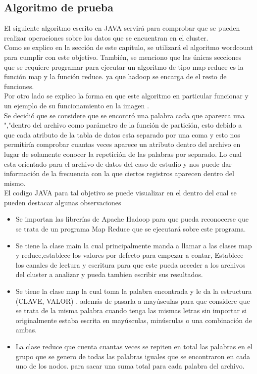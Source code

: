 \subsection{Algoritmo de prueba}
El siguiente algoritmo escrito en JAVA servirá para comprobar que se pueden realizar operaciones sobre los datos
que se encuentran en el cluster.
\\
Como se explico en la sección  de este capitulo, se utilizará el algoritmo wordcount para cumplir con este objetivo.
También, se menciono que las únicas secciones que se requiere programar para ejecutar un algoritmo de tipo map
reduce es la función map y la función reduce. ya que hadoop se encarga de el resto de funciones.
\\
Por otro lado se explico la forma en que este algoritmo en particular funcionar y un ejemplo de su funcionamiento en
la imagen .
\\
Se decidió que se considere que se encontró una palabra cada que aparezca una ","dentro del archivo como parámetro
de la función de partición, esto debido a que cada atributo de la tabla de datos esta separado por una coma y esto nos
permitiría comprobar cuantas veces aparece un atributo dentro del archivo en lugar de solamente conocer la repetición
de las palabras por separado. Lo cual esta orientado para el archivo de datos del caso de estudio y nos puede dar
información de la frecuencia con la que ciertos registros aparecen dentro del mismo.
\\
El codigo JAVA para tal objetivo se puede visualizar en el 
dentro del cual se pueden destacar algunas observaciones
\begin{itemize}
	\item Se importan las librerías de Apache Hadoop para que pueda reconocerse que se trata de un programa Map Reduce
	que se ejecutará sobre este programa.
	\item Se tiene la clase main la cual principalmente manda a llamar a las clases map y reduce,establece los valores por
	defecto para empezar a contar, Establece los canales de lectura y escritura para que este pueda acceder a los
	archivos del cluster a analizar y pueda tambien escribir sus resultados.
	\item Se tiene la clase map la cual toma la palabra encontrada y le da la estructura (CLAVE, VALOR) , además de
	pasarla a mayúsculas para que considere que se trata de la misma palabra cuando tenga las mismas letras sin
	importar si originalmente estaba escrita en mayúsculas, minúsculas o una combinación de ambas.
	\item La clase reduce que cuenta cuantas veces se repiten en total las palabras en el grupo que se genero de todas las
	palabras iguales que se encontraron en cada uno de los nodos. para sacar una suma total para cada palabra del
	archivo.
\end{itemize}
